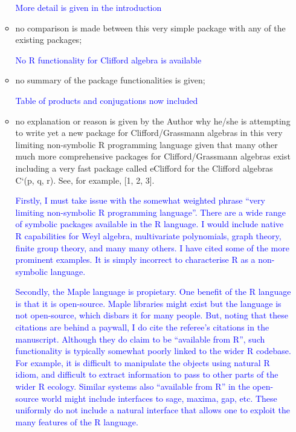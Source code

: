 \documentclass{article}
\begin{document}
\begin{itemize}
\begin{itemize}
  \textcolor{blue}{More detail is given in the introduction}
\item no comparison is made between this very simple package with any of the existing packages;

  \textcolor{blue}{No R functionality for Clifford algebra is available}

\item  no summary of the package functionalities is given;

    \textcolor{blue}{Table of products and conjugations now included}

\item  no explanation or reason is given by the Author why he/she is attempting to write yet
a new package for Clifford/Grassmann algebras in this very limiting non-symbolic R
programming language given that many other much more comprehensive packages for
Clifford/Grassmann algebras exist including a very fast package called eClifford for
the Clifford algebras C`(p, q, r). See, for example, [1, 2, 3].

\textcolor{blue}{Firstly, I must take issue with the somewhat weighted
  phrase ``very limiting non-symbolic R programming language''.  There
  are a wide range of symbolic packages available in the R language.
  I would include native R capabilities for Weyl algebra, multivariate
  polynomials, graph theory, finite group theory, and many many
  others.  I have cited some of the more prominent examples.  It is
  simply incorrect to characterise R as a non-symbolic language.}

  \textcolor{blue}{Secondly, the Maple language is propietary.  One
    benefit of the R language is that it is open-source.  Maple
    libraries might exist but the language is not open-source, which
    disbars it for many people.  But, noting that these citations are
    behind a paywall, I do cite the referee's citations in the
    manuscript.  Although they do claim to be ``available from R'',
    such functionality is typically somewhat poorly linked to the
    wider R codebase.  For example, it is difficult to manipulate the
    objects using natural R idiom, and difficult to extract
    information to pass to other parts of the wider R ecology.
    Similar systems also ``available from R'' in the open-source world
    might include interfaces to sage, maxima, gap, etc.  These
    uniformly do not include a natural interface that allows one to
    exploit the many features of the R language.
 }

\end{itemize}


\end{itemize}
\end{document}
